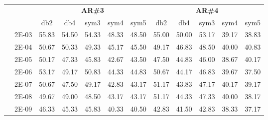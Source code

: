 \begin{table}[H]
\begin{tabular}{|c|c|c c c c c|c c c c c|}
\cline{3-12}
\multicolumn{2}{c}{} & \multicolumn{5}{|c|}{\textbf{AR\#3}}  & \multicolumn{5}{c|}{\textbf{AR\#4}} \\\cline{3-12}
\multicolumn{2}{c}{}  & \multicolumn{1}{|c}{db2} & db4 & sym3 & sym4 & sym5 & db2 & db4& sym3 & sym4 & sym5 \\\hline
\multicolumn{1}{|c|}{ \multirow{6}{*}{\rotatebox[origin=c]{90}{\textbf{Gamma}}} }
&2E-03&	55.83&	54.50&	54.33&	48.33&	48.50&	55.00	&50.00&	53.17&	39.17&	38.83	\\\cline{2-12}
&2E-04&	50.67&	50.33&	49.33&	45.17&	45.50&	49.17	&46.83&	48.50&	40.00&	40.83	\\\cline{2-12}
&2E-05&	50.17&	47.33&	45.83&	42.67&	43.50&	47.50	&44.83&	46.00&	38.67&	40.17	\\\cline{2-12}
&2E-06&	53.17&	49.17&	50.83&	44.33&	44.83&	50.67	&44.17&	46.83&	39.67&	37.50	\\\cline{2-12}
&2E-07&	50.67&	47.50&	49.17&	42.83&	43.17&	51.17	&43.83&	47.17&	40.17&	39.17	\\\cline{2-12}
&2E-08&	49.67&	49.00&	48.50&	43.17&	43.17&	51.17	&44.33&	47.33&	40.00&	38.17	\\\cline{2-12}
&2E-09&	46.33&	45.33&	45.83&	40.33&	40.50&	42.83	&41.50&	42.83&	38.33&	37.17	
	
	
	
\\\midrule
\end{tabular}

\end{table}


